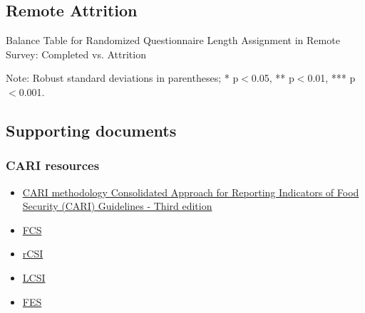 \documentclass[11pt,harvard]{article}
\begin{document}
	\pagebreak
	
	\subsection{Remote Attrition}
	
	\begin{table}[htbp]
		\centering
		\begin{adjustbox}{max width=\textwidth}
			\begin{threeparttable}
				\caption{Balance Table for Randomized Questionnaire Length Assignment in Remote Survey: Completed vs. Attrition}
				\small
				 
				\label{tab:BF_Listing_Demo_Attrition_Remote}
				\begin{tablenotes}
					\item Note: Robust standard deviations in parentheses; * p$<$0.05, ** p$<$0.01, *** p$<$0.001.
				\end{tablenotes}
			\end{threeparttable}
		\end{adjustbox}
	\end{table}
	
	\pagebreak
	
	\pagebreak
	
	\subsection{Supporting documents}
	\subsubsection{CARI resources}
	\begin{itemize}
		\item \href{https://resources.vam.wfp.org/data-analysis/quantitative/food-security/cari}{CARI methodology Consolidated Approach for Reporting Indicators of Food Security (CARI) Guidelines - Third edition}
		\item \href{https://resources.vam.wfp.org/data-analysis/quantitative/food-security/food-consumption-score}{FCS}
		\item \href{https://resources.vam.wfp.org/data-analysis/quantitative/food-security/reduced-coping-strategies-index}{rCSI}
		\item \href{https://resources.vam.wfp.org/data-analysis/quantitative/food-security/livelihood-coping-strategies-food-security}{LCSI}
		\item \href{https://resources.vam.wfp.org/data-analysis/quantitative/food-security/food-expenditure-share}{FES}
	\end{itemize} 
	
\end{document}
